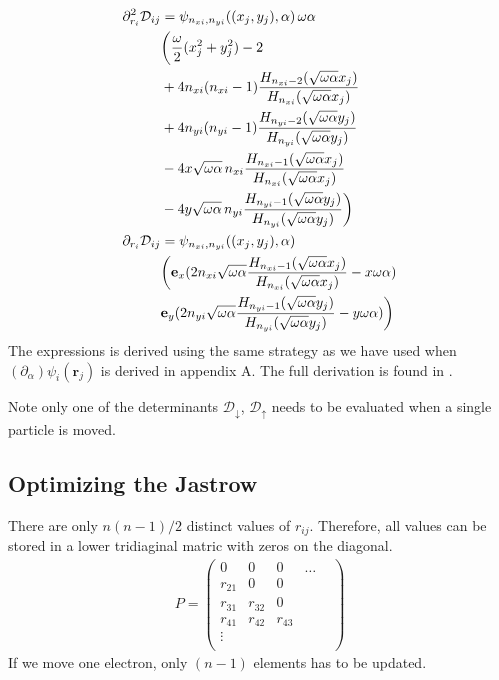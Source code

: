\documentclass[a4paper,10pt,twocolumn]{article} %
\newcommand{\ts}[1]{\textbf{#1}}
\begin{document}
\begin{align}
	\partial^2_{r_i}\mathcal D_{ij} &= %
	\psi_{n_{xi},n_{yi}}((x_j,y_j),\alpha) \, \omega\alpha\notag\\
	&\bigg( 
		\frac{\omega}2(x_j^2+y_j^2)-2\notag\\
	&	+4n_{xi}(n_{xi}-1) \frac{H_{n_{xi}-2}(\sqrt{\omega\alpha}x_j)}{H_{n_{xi}}(\sqrt{\omega\alpha}x_j)}\notag\\
	&	+4n_{yi}(n_{yi}-1) \frac{H_{n_{yi}-2}(\sqrt{\omega\alpha}y_j)}{H_{n_{yi}}(\sqrt{\omega\alpha}y_j)}\notag\\
	&		-4x\sqrt{\omega\alpha}\,n_{xi}\frac{H_{n_{xi}-1}(\sqrt{\omega\alpha}x_j)}{H_{n_{xi}}(\sqrt{\omega\alpha}x_j)}\notag\\
	&		-4y\sqrt{\omega\alpha}\,n_{yi}\frac{H_{n_{yi}-1}(\sqrt{\omega\alpha}y_j)}{H_{n_{yi}}(\sqrt{\omega\alpha}y_j)}
	\bigg)\\
 	\partial_{r_i}\mathcal D_{ij} &%
	=\psi_{n_{xi},n_{yi}}((x_j,y_j),\alpha) \notag\\
		&\bigg( 
		\ts e_x(2n_{xi}\sqrt{\omega\alpha}\frac{H_{n_{xi}-1}(\sqrt{\omega\alpha}x_j)}{H_{n_{xi}}(\sqrt{\omega\alpha}x_j)}-x\omega\alpha)\notag\\
		&\ts e_y(2n_{yi}\sqrt{\omega\alpha}\frac{H_{n_{yi}-1}(\sqrt{\omega\alpha}y_j)}{H_{n_{yi}}(\sqrt{\omega\alpha}y_j)}-y\omega\alpha)
		\bigg)
\end{align}
The expressions is derived using the same strategy as we have used when $(\partial_\alpha)\psi_i(\ts r_j)$ is derived in appendix A.
The full derivation is found in \cite{lars_eivind_thesis}.

Note only one of the determinants $\mathcal D_\downarrow$, $\mathcal D_\uparrow$ needs to be evaluated when a single particle is moved.

\subsection{Optimizing the Jastrow}%

There are only $n(n-1)/2$ distinct values of $r_{ij}$. Therefore, all values can be stored in a lower tridiaginal matric with zeros on the diagonal.
\begin{align}
	P = 
\left(
\begin{matrix}
	0 		& 0	 	&0 		&\dots	&\\
	r_{21}  & 0 	&0 		& &\\
	r_{31} 	& r_{32}&0 		& &\\
	r_{41} 	& r_{42}&r_{43} & &\\
	\vdots 	& 		& 		& &\\
\end{matrix}
\right)\label{eqP}
\end{align}
If we move one electron, only $(n-1)$ elements has to be updated. 
\end{document}
